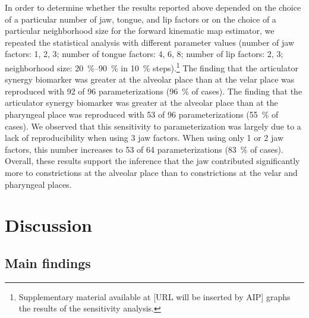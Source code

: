 \documentclass[reprint]{JASAnew}\usepackage[]{graphicx}\usepackage[]{color}
\begin{document}
In order to determine whether the results reported above depended on the choice of a particular number of jaw, tongue, and lip factors or on the choice of a particular neighborhood size for the forward kinematic map estimator, we repeated the statistical analysis with different parameter values (number of jaw factors: 1, 2, 3; number of tongue factors: 4, 6, 8; number of lip factors: 2, 3; neighborhood size: \SIrange{20}{90}{\percent} in \SI{10}{\percent} steps).\footnote{Supplementary material available at [URL will be inserted by AIP] graphs the results of the sensitivity analysis.}
%
The finding that the articulator synergy biomarker was greater at the alveolar place than at the velar place was reproduced with 92 of 96 parameterizations (\SI{96}{\percent} of cases).
%
The finding that the articulator synergy biomarker was greater at the alveolar place than at the pharyngeal place was reproduced with 53 of 96 parameterizations (\SI{55}{\percent} of cases).
%
We observed that this sensitivity to parameterization was largely due to a lack of reproducibility when using 3 jaw factors. 
%
When using only 1 or 2 jaw factors, this number increases to 53 of 64 parameterizations (\SI{83}{\percent} of cases).
%
Overall, these results support the inference that the jaw contributed significantly more to constrictions at the alveolar place than to constrictions at the velar and pharyngeal places.









\section{Discussion}
\label{sec:discussion}

\subsection{Main findings}
\end{document}
